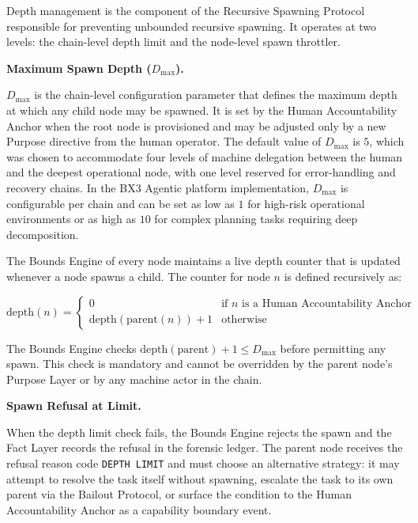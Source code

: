 Depth management is the component of the Recursive Spawning Protocol responsible for preventing unbounded recursive spawning. It operates at two levels: the chain-level depth limit and the node-level spawn throttler.

\bigskip

\noindent\textbf{Maximum Spawn Depth ($D_{\max}$).}

$D_{\max}$ is the chain-level configuration parameter that defines the maximum depth at which any child node may be spawned. It is set by the Human Accountability Anchor when the root node is provisioned and may be adjusted only by a new Purpose directive from the human operator. The default value of $D_{\max}$ is $5$, which was chosen to accommodate four levels of machine delegation between the human and the deepest operational node, with one level reserved for error-handling and recovery chains. In the BX3 Agentic platform implementation, $D_{\max}$ is configurable per chain and can be set as low as $1$ for high-risk operational environments or as high as $10$ for complex planning tasks requiring deep decomposition.

The Bounds Engine of every node maintains a live depth counter that is updated whenever a node spawns a child. The counter for node $n$ is defined recursively as:

\begin{equation}
\text{depth}(n) = 
\begin{cases}
0 & \text{if } n \text{ is a Human Accountability Anchor} \\
\text{depth}(\text{parent}(n)) + 1 & \text{otherwise}
\end{cases}
\end{equation}

The Bounds Engine checks $\text{depth}(\text{parent}) + 1 \leq D_{\max}$ before permitting any spawn. This check is mandatory and cannot be overridden by the parent node's Purpose Layer or by any machine actor in the chain.

\bigskip

\noindent\textbf{Spawn Refusal at Limit.}

When the depth limit check fails, the Bounds Engine rejects the spawn and the Fact Layer records the refusal in the forensic ledger. The parent node receives the refusal reason code \texttt{DEPTH\ LIMIT} and must choose an alternative strategy: it may attempt to resolve the task itself without spawning, escalate the task to its own parent via the Bailout Protocol, or surface the condition to the Human Accountability Anchor as a capability boundary event.

